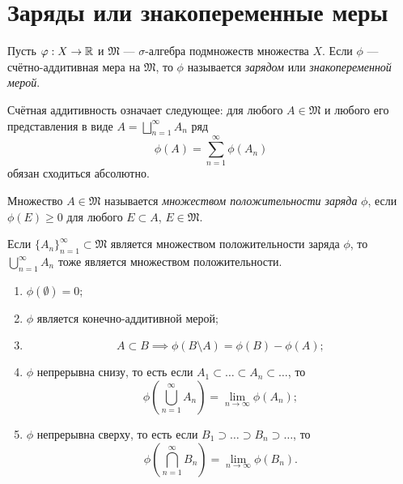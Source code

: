 \section{Заряды или знакопеременные меры}
\begin{definition}
    Пусть $\varphi: X \to \mathbb{R}$ и $\mathfrak{M}$ — $\sigma$-алгебра подмножеств множества $X$.
    Если $\phi$ — счётно-аддитивная мера на $\mathfrak{M}$, то $\phi$ называется \textit{зарядом} или \textit{знакопеременной мерой}.
\end{definition} 
Счётная аддитивность означает следующее: для любого $A \in \mathfrak{M}$ и любого его представления в виде $A = \bigsqcup\limits_{n=1}^{\infty}A_n$ ряд
\[\phi(A) = \sum\limits_{n=1}^{\infty}\phi(A_n)\]
обязан сходиться абсолютно.

\begin{definition}
    Множество $A \in \mathfrak{M}$ называется \textit{множеством положительности заряда} $\phi$, если $\phi(E) \geqslant 0$ для любого $E \subset A$, $E \in \mathfrak{M}$.
\end{definition} 
Если $\{A_n\}_{n=1}^\infty \subset \mathfrak{M}$ является множеством положительности заряда $\phi$, то $\bigcup\limits_{n=1}^{\infty} A_n$ тоже является множеством положительности.

\begin{theorem}\tab
    \begin{enumerate}
        \item $\phi(\emptyset)=0$;
        \item $\phi$ является конечно-аддитивной мерой;
        \item \[A \subset B \implies \phi(B \setminus A) = \phi(B) - \phi(A);\]
        \item $\phi$ непрерывна снизу, то есть если $A_1 \subset \dots \subset A_n \subset \dots$, то
        \[\phi\left(\bigcup\limits_{n=1}^{\infty}A_n\right)=\lim\limits_{n\to \infty}\phi(A_n);\]
        \item $\phi$ непрерывна сверху, то есть если $B_1 \supset \dots \supset B_n \supset \dots$, то 
        \[\phi\left(\bigcap\limits_{n=1}^{\infty}B_n\right)=\lim\limits_{n\to \infty}\phi(B_n).\]
    \end{enumerate}
\end{theorem} 

